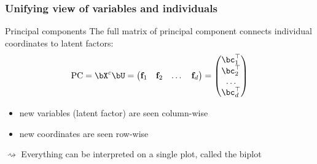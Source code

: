 \documentclass{beamer}\usepackage[]{graphicx}\usepackage[]{color}
\begin{document}
\begin{frame}[fragile]
  \frametitle{Unifying view of variables and individuals}

  \begin{block}{Principal components}
   The full matrix of principal component connects  individual coordinates to latent factors:
    \begin{equation*}
      \mathrm{PC} = \bX^c \bU = \begin{pmatrix}
      \mathbf{f}_{1} & \mathbf{f}_{2} & \dots & \mathbf{f}_{d}
      \end{pmatrix}
      = \begin{pmatrix} 
      \bc_{1}^\top \\ \bc_{2}^\top \\\dots \\ \bc_{d}^\top 
      \end{pmatrix}
    \end{equation*}
  \end{block}

  \vfill
  
  \begin{itemize}
    \item new variables (latent factor) are seen column-wise
    \item new coordinates are seen row-wise
  \end{itemize}

  $\rightsquigarrow$ Everything can be interpreted on a single plot, called the biplot

\end{frame}
\end{document}
